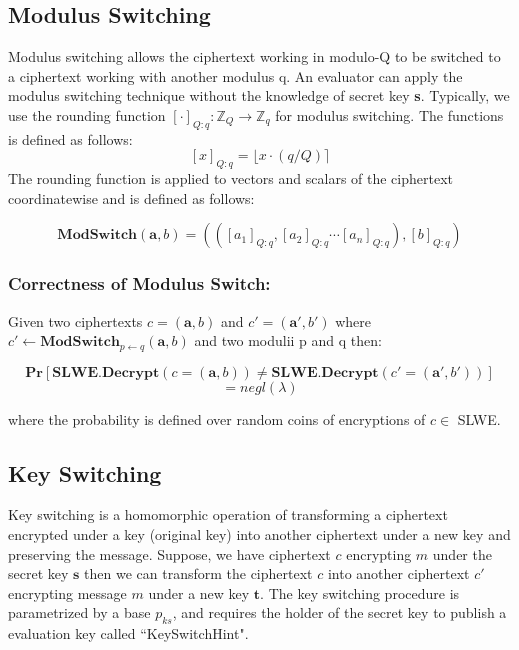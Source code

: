\documentclass[10pt,journal,compsoc]{IEEEtran}
\theoremstyle{definition}
\begin{document}
\subsection{Modulus Switching}

Modulus switching allows the ciphertext working in modulo-Q to be switched to a ciphertext working with another modulus q. An evaluator can apply the modulus switching technique without the knowledge of secret key \textbf{s}. Typically, we use the rounding function $[\cdot]_{Q:q}:\mathbb{Z}_Q \rightarrow \mathbb{Z}_q$ for modulus switching. The functions is defined as follows:
$$[x]_{Q:q} = \lfloor x\cdot (q/Q)\rceil$$
The rounding function is applied to vectors and scalars of the ciphertext coordinatewise and is defined as follows:

$$\textbf{ModSwitch}\left(\textbf{a},b\right) = \left(\left([a_1]_{Q:q},[a_2]_{Q:q}\cdots[a_n]_{Q:q}\right),[b]_{Q:q}\right)$$

\subsubsection{\textbf{Correctness of Modulus Switch}:}

Given two ciphertexts $c = \left(\textbf{a},b\right)$ and $c' = \left(\textbf{a}',b'\right)$ where $c' \leftarrow \textbf{ModSwitch}_{p\leftarrow q}\left(\textbf{a},b\right)$ and two modulii p and q then:

$$\textbf{Pr}\left[ \textbf{SLWE.Decrypt} \left( c = \left(\textbf{a},b\right)\right)\neq \textbf{SLWE.Decrypt} \left( c' = \left(\textbf{a}',b'\right)\right) \right]$$
$$=negl(\lambda)$$

where the probability is defined over random coins of encryptions of $c \in$ SLWE.

\subsection{Key Switching}

Key switching is a homomorphic operation of transforming a ciphertext encrypted under a key (original  key) into another ciphertext under a new key and preserving the message. Suppose, we have ciphertext $c$ encrypting $m$ under the secret key $\textbf{s}$ then we can transform the ciphertext $c$ into another ciphertext $c'$ encrypting message $m$ under a new key $\textbf{t}$.  The key switching procedure is parametrized by a base $p_{ks}$, and requires the holder of the secret key to publish a evaluation key called ``KeySwitchHint".
\end{document}
